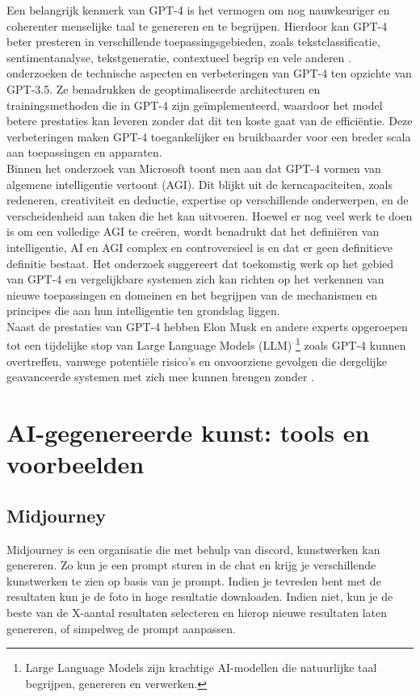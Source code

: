 Een belangrijk kenmerk van GPT-4 is het vermogen om nog nauwkeuriger en coherenter menselijke taal te genereren en te begrijpen. Hierdoor kan GPT-4 beter presteren in verschillende toepassingsgebieden, zoals tekstclassificatie, sentimentanalyse, tekstgeneratie, contextueel begrip en vele anderen \autocite{gpt_micai}. \\

\autocite{gpt_cn} onderzoeken de technische aspecten en verbeteringen van GPT-4 ten opzichte van GPT-3.5. Ze benadrukken de geoptimaliseerde architecturen en trainingsmethoden die in GPT-4 zijn geïmplementeerd, waardoor het model betere prestaties kan leveren zonder dat dit ten koste gaat van de efficiëntie. Deze verbeteringen maken GPT-4 toegankelijker en bruikbaarder voor een breder scala aan toepassingen en apparaten. \\

Binnen het onderzoek van Microsoft \autocite{gpt_micai} toont men aan dat GPT-4 vormen van algemene intelligentie vertoont (AGI). Dit blijkt uit de kerncapaciteiten, zoals redeneren, creativiteit en deductie, expertise op verschillende onderwerpen, en de verscheidenheid aan taken die het kan uitvoeren. Hoewel er nog veel werk te doen is om een volledige AGI te creëren, wordt benadrukt dat het definiëren van intelligentie, AI en AGI complex en controversieel is en dat er geen definitieve definitie bestaat. Het onderzoek suggereert dat toekomstig werk op het gebied van GPT-4 en vergelijkbare systemen zich kan richten op het verkennen van nieuwe toepassingen en domeinen en het begrijpen van de mechanismen en principes die aan hun intelligentie ten grondslag liggen. \\

Naast de prestaties van GPT-4 hebben Elon Musk en andere experts opgeroepen tot een tijdelijke stop van Large Language Models (LLM) \footnote{Large Language Models zijn krachtige AI-modellen die natuurlijke taal begrijpen, genereren en verwerken.} zoals GPT-4 kunnen overtreffen, vanwege potentiële risico's en onvoorziene gevolgen die dergelijke geavanceerde systemen met zich mee kunnen brengen zonder \autocite{reuters_musk}. 
 
\section{AI-gegenereerde kunst: tools en voorbeelden}
\label{sub:tools}
\subsection{ Midjourney}
Midjourney is een organisatie die met behulp van discord, kunstwerken kan genereren. Zo kun je een prompt sturen in de chat en krijg je verschillende kunstwerken te zien op basis van je prompt. Indien je tevreden bent met de resultaten kun je de foto in hoge resultatie downloaden. Indien niet, kun je de beste van de X-aantal resultaten selecteren en hierop nieuwe resultaten laten genereren, of simpelweg de prompt aanpassen. 

